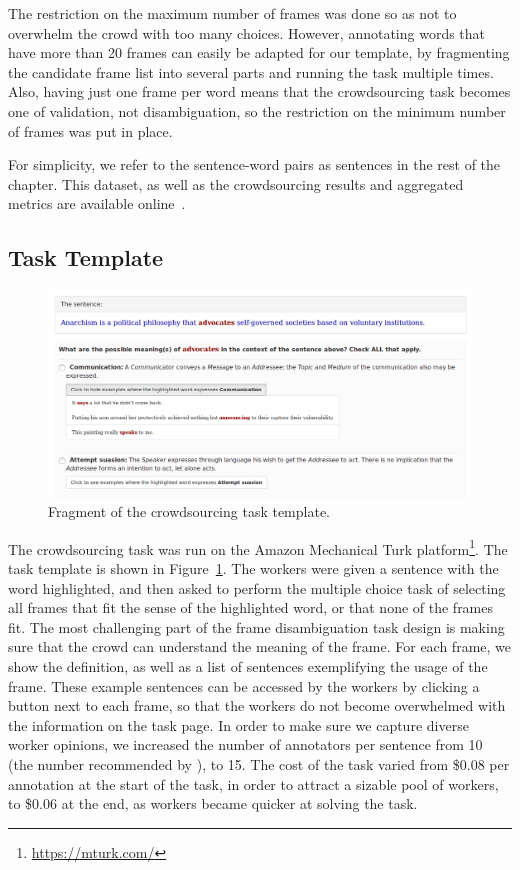 The restriction on the maximum number of frames was done so as not to overwhelm the crowd with too many choices. However, annotating words that have more than 20 frames can easily be adapted for our template, by fragmenting the candidate frame list into several parts and running the task multiple times. Also, having just one frame per word means that the crowdsourcing task becomes one of validation, not disambiguation, so the restriction on the minimum number of frames was put in place.

For simplicity, we refer to the sentence-word pairs as sentences in the rest of the chapter. This dataset, as well as the crowdsourcing results and aggregated metrics are available online~\cite{anca_dumitrache_2018_1472345}.

\subsection{Task Template}


\begin{figure}[thb!]
\centering
\includegraphics[width=\textwidth]{img/sent-frame.png}
\caption{Fragment of the crowdsourcing task template.}
\label{fig:ch5template}
\end{figure}


The crowdsourcing task was run on the Amazon Mechanical Turk platform\footnote{\url{https://mturk.com/}}. The task template is shown in Figure~\ref{fig:ch5template}. The workers were given a sentence with the word highlighted, and then asked to perform the multiple choice task of selecting all frames that fit the sense of the highlighted word, or that none of the frames fit. The most challenging part of the frame disambiguation task design is making sure that the crowd can understand the meaning of the frame. For each frame, we show the definition, as well as a list of sentences exemplifying the usage of the frame. These example sentences can be accessed by the workers by clicking a button next to each frame, so that the workers do not become overwhelmed with the information on the task page. In order to make sure we capture diverse worker opinions, we increased the number of annotators per sentence from 10 (the number recommended by \citet{Hong:2011:GCR:2018966.2018970}), to 15. The cost of the task varied from \$0.08 per annotation at the start of the task, in order to attract a sizable pool of workers, to \$0.06 at the end, as workers became quicker at solving the task.

